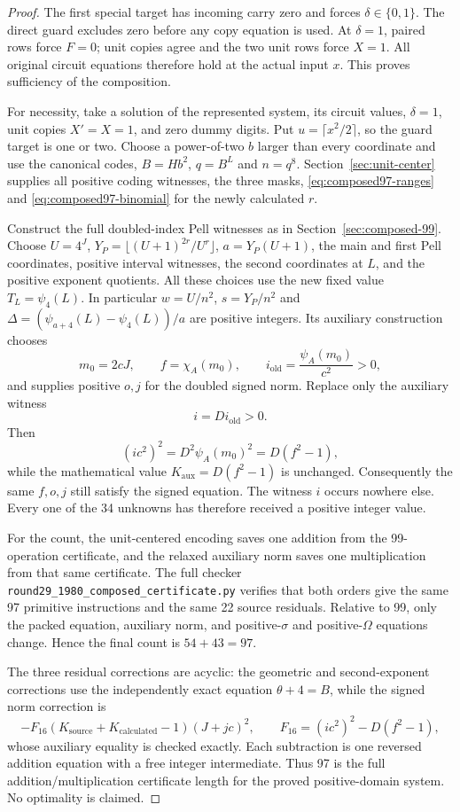 \begin{proof}
The first special target has incoming carry zero and forces
$\delta\in\{0,1\}$. The direct guard excludes zero before any
copy equation is used. At $\delta=1$, paired rows force $F=0$;
unit copies agree and the two unit rows force $X=1$. All original
circuit equations therefore hold at the actual input $x$. This
proves sufficiency of the composition.

For necessity, take a solution of the represented system, its
circuit values, $\delta=1$, unit copies $X'=X=1$, and zero dummy
digits. Put $u=\lceil x^2/2\rceil$, so the guard target is one or
two. Choose a power-of-two $b$ larger than every coordinate and
use the canonical codes, $B=Hb^2$, $q=B^L$ and $n=q^8$.
Section~\ref{sec:unit-center} supplies all positive coding witnesses,
the three masks, \eqref{eq:composed97-ranges} and
\eqref{eq:composed97-binomial} for the newly calculated $r$.

Construct the full doubled-index Pell witnesses as in
Section~\ref{sec:composed-99}. Choose $U=4^J$,
$Y_P=\lfloor(U+1)^{2r}/U^r\rfloor$, $a=Y_P(U+1)$, the main and
first Pell coordinates, positive interval witnesses, the second
coordinates at $L$, and the positive exponent quotients. All these
choices use the new fixed value $T_L=\psi_4(L)$. In particular
$w=U/n^2$, $s=Y_P/n^2$ and
$\Delta=(\psi_{a+4}(L)-\psi_4(L))/a$ are positive integers.
Its auxiliary construction chooses
\[
 m_0=2cJ,\qquad f=\chi_A(m_0),\qquad
 i_{\mathrm{old}}=\frac{\psi_A(m_0)}{c^2}>0,
\]
and supplies positive $o,j$ for the doubled signed norm. Replace
only the auxiliary witness
\[
 i=D i_{\mathrm{old}}>0.
\]
Then
\[
 (ic^2)^2=D^2\psi_A(m_0)^2=D(f^2-1),
\]
while the mathematical value $K_{\mathrm{aux}}=D(f^2-1)$ is
unchanged. Consequently the same $f,o,j$ still satisfy the signed
equation. The witness $i$ occurs nowhere else. Every one of the
34 unknowns has therefore received a positive integer value.

For the count, the unit-centered encoding saves one addition from
the 99-operation certificate, and the relaxed auxiliary norm saves
one multiplication from that same certificate. The full checker
\texttt{round29\_1980\_composed\_certificate.py} verifies that both
orders give the same 97 primitive instructions and the same 22
source residuals. Relative to 99, only the packed equation,
auxiliary norm, and positive-$\sigma$ and positive-$\Omega$
equations change. Hence the final count is $54+43=97$.

The three residual corrections are acyclic: the geometric and
second-exponent corrections use the independently exact equation
$\theta+4=B$, while the signed norm correction is
\[
 -F_{16}(K_{\mathrm{source}}+K_{\mathrm{calculated}}-1)(J+jc)^2,
 \qquad F_{16}=(ic^2)^2-D(f^2-1),
\]
whose auxiliary equality is checked exactly. Each subtraction is
one reversed addition equation with a free integer intermediate.
Thus 97 is the full addition/multiplication certificate length for
the proved positive-domain system. No optimality is claimed.
\end{proof}
